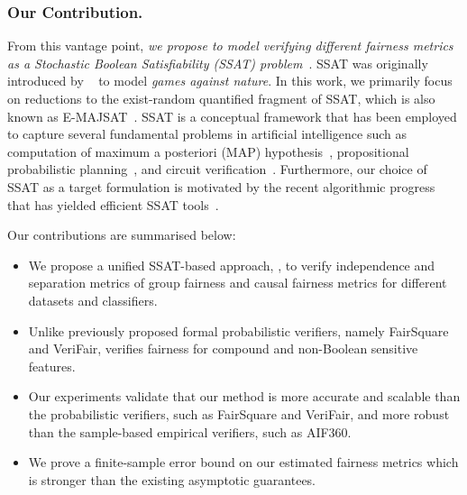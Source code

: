 \subsubsection{Our Contribution.} From this vantage point, \textit{we propose to model verifying different fairness metrics as a Stochastic Boolean Satisfiability (SSAT) problem}~\cite{littman2001stochastic}. SSAT was originally introduced by ~\cite{papadimitriou1985games} to model {\em games against nature}. In this work, we primarily focus on reductions to the exist-random quantified fragment of SSAT, which is also known as E-MAJSAT~\cite{littman2001stochastic}.   SSAT is a conceptual framework that has been employed to capture several fundamental problems in artificial intelligence such as computation of maximum a posteriori (MAP) hypothesis~\cite{fremont2017maximum},  propositional probabilistic planning~\cite{majercik2007appssat},  and circuit verification~\cite{lee2018towards}. Furthermore, our choice of SSAT as a target formulation is motivated by the recent algorithmic progress that has yielded efficient SSAT tools~\cite{lee2017solving,lee2018solving}.




Our contributions are summarised below:
\begin{itemize}
	\item We propose a unified SSAT-based approach, {\justicia}, to verify independence and separation metrics of group fairness and causal fairness metrics for different datasets and classifiers.
	\item Unlike previously proposed formal probabilistic verifiers, namely FairSquare and VeriFair, {\justicia} verifies fairness for compound and non-Boolean sensitive features.%
	\item Our experiments validate that our method is more accurate and scalable than the probabilistic verifiers, such as FairSquare and VeriFair, and more robust than the sample-based empirical verifiers, such as AIF360.
	\item We prove a finite-sample error bound on our estimated fairness metrics which is stronger than the existing asymptotic guarantees.
\end{itemize}

